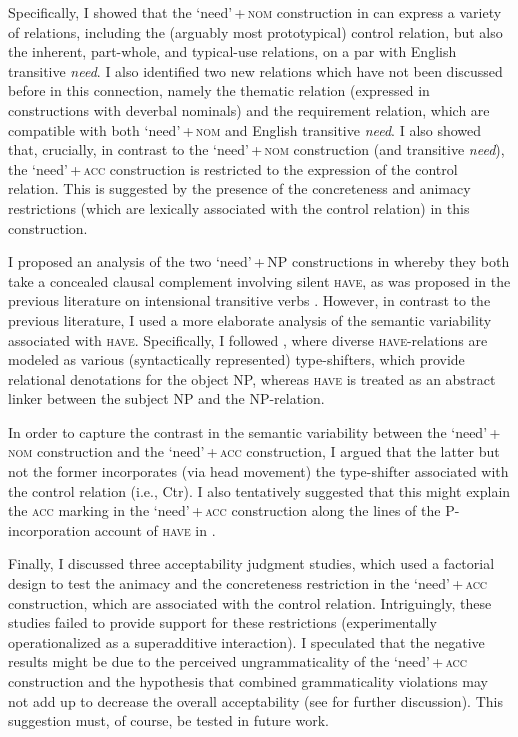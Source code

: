 \documentclass[output=paper]{langscibook}
\begin{document}
Specifically, I showed that the `need'\,+\,\textsc{nom} construction in 
can express a variety of relations, including the (arguably most prototypical) control relation, but also the inherent, part-whole, and typical-use relations, on a par with English transitive \textit{need}. I also identified two new relations which have not been discussed before in this connection, namely the thematic relation (expressed in constructions with deverbal nominals) and the requirement relation, which are compatible with both `need'\,+\,\textsc{nom} and English transitive \textit{need}. I also showed that, crucially, in contrast to the `need'\,+\,\textsc{nom} construction (and transitive \textit{need}), the `need'\,+\,\textsc{acc} construction is restricted to the expression of the control relation. This is suggested by the presence of the concreteness and animacy restrictions (which are lexically associated with the control relation) in this construction.

\begin{sloppypar}
I proposed an analysis of the two `need'\,+\,NP constructions in  whereby they both take a concealed clausal complement involving silent \textsc{have}, as was proposed in the previous literature on intensional transitive verbs \citep[e.g.,][]{Harves2008}. However, in contrast to the previous literature, I used a more elaborate analysis of the semantic variability associated with \textsc{have}. Specifically, I followed \citet{Zaroukian.Beller2013}, where diverse \textsc{have}-relations are modeled as various (syntactically represented) type-shifters, which provide relational denotations for the object NP, whereas \textsc{have} is treated as an abstract linker between the subject NP and the NP-relation.
\end{sloppypar}

In order to capture the contrast in the semantic variability between the `need'\,+ \textsc{nom} construction and the `need'\,+\,\textsc{acc} construction, I argued that the latter but not the former incorporates (via head movement) the type-shifter associated with the control relation (i.e., Ctr). I also tentatively suggested that this might explain the \textsc{acc} marking in the `need'\,+\,\textsc{acc} construction along the lines of the P-incorporation account of \textsc{have} in \citet{Freeze1992} \citep[see also][]{Kayne1993}.


Finally, I discussed three acceptability judgment studies, which used a factorial design to test the animacy and the concreteness restriction in the `need'\,+\,\textsc{acc} construction, which are associated with the control relation. Intriguingly, these studies failed to provide support for these restrictions (experimentally operationalized as a superadditive interaction). I speculated that the negative results might be due to the perceived ungrammaticality of the `need'\,+\,\textsc{acc} construction and the hypothesis that combined grammaticality violations may not add up to decrease the overall acceptability (see \citealt{Hofmeister.Casasanto.Staum.Sag2014} for further discussion). This suggestion must, of course, be tested in future work.
\end{document}
